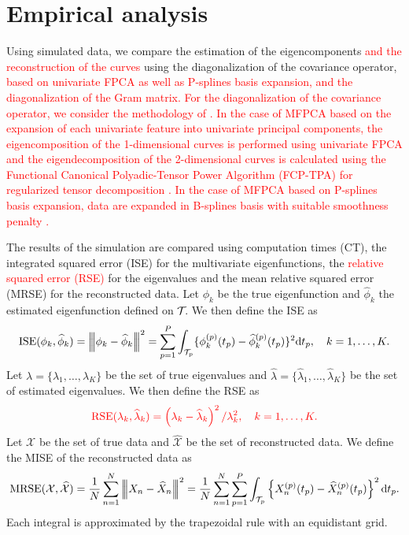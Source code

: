 \section{Empirical analysis} %
\label{sec:empirical_analysis}


Using simulated data, we compare the estimation of the eigencomponents \textcolor{red}{and the reconstruction of the curves} using the diagonalization of the covariance operator, \textcolor{red}{based on univariate FPCA as well as P-splines basis expansion, and the diagonalization of the Gram matrix. For the diagonalization of the covariance operator, we consider the methodology of \cite{happMultivariateFunctionalPrincipal2018a}. In the case of MFPCA based on the expansion of each univariate feature into univariate principal components, the eigencomposition of the 1-dimensional curves is performed using univariate FPCA and the eigendecomposition of the 2-dimensional curves is calculated using the Functional Canonical Polyadic-Tensor Power Algorithm (FCP-TPA) for regularized tensor decomposition \citep{allenMultiwayFunctionalPrincipal2013a}. In the case of MFPCA based on P-splines basis expansion, data are expanded in B-splines basis with suitable smoothness penalty \citep{eilersFlexibleSmoothingBsplines1996}.}

The results of the simulation are compared using computation times (CT), the integrated squared error (ISE) for the multivariate eigenfunctions, the \textcolor{red}{relative squared error (RSE)} for the eigenvalues and the mean relative squared error (MRSE) for the reconstructed data. Let $\phi_k$ be the true eigenfunction and $\widehat{\phi}_k$ the estimated eigenfunction defined on $\mathcal{T}_{}$. We then define the ISE as 
\begin{equation}\label{eq:ise_eigenfunctions}
    \text{ISE}(\phi_k, \widehat{\phi}_k) = \left|\!\left|\!\left|\phi_k - \widehat{\phi}_k\right|\!\right|\!\right|^2 = \sum_{p = 1}^P \int_{\mathcal{T}_{p}} \{\phi^{(p)}_k(t_p) - \widehat{\phi}^{(p)}_k(t_p)\}^2 {\rm d} t_p, \quad k = 1, \dots, K.
\end{equation}
Let $\lambda = \{\lambda_1, \dots, \lambda_K\}$ be the set of true eigenvalues and $\widehat{\lambda} = \{\widehat{\lambda}_1, \dots, \widehat{\lambda}_K\}$ be the set of estimated eigenvalues. We then define the RSE as 
\begin{equation}\label{eq:mse_eigenvalues}
    \textcolor{red}{\text{RSE}(\lambda_k, \widehat{\lambda}_k) = \left(\lambda_k - \widehat{\lambda}_k\right)^2 / \lambda_k^2, \quad k = 1, \dots, K.}
\end{equation}
Let $\mathcal{X}$ be the set of true data and $\widehat{\mathcal{X}}$ be the set of reconstructed data. We define the MISE of the reconstructed data as
\begin{equation}\label{eq:mise_reconstructed_data}
    \text{MRSE}(\mathcal{X}, \widehat{\mathcal{X}}) = \frac{1}{N}\sum_{n = 1}^N \left|\!\left|\!\left|X_n - \widehat{X}_n\right|\!\right|\!\right|^2 = \frac{1}{N}\sum_{n = 1}^N \sum_{p = 1}^P \int_{\mathcal{T}_{p}} \left\{X_n^{(p)}(t_p) - \widehat{X}_n^{(p)}(t_p) \right\}^2 {\rm d} t_p.
\end{equation}
Each integral is approximated by the trapezoidal rule with an equidistant grid.

